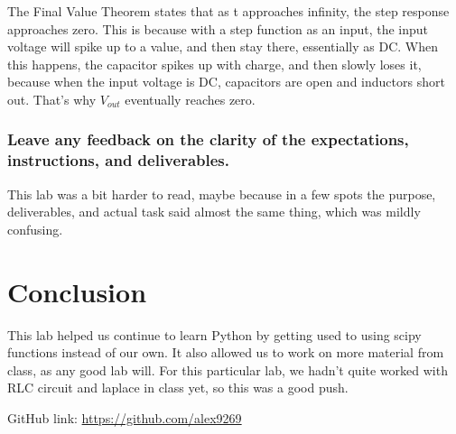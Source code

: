 \documentclass[12pt]{report}
\begin{document}
 The Final Value Theorem states that as t approaches infinity, the step response approaches zero. This is because with a step function as an input, the input voltage will spike up to a value, and then stay there, essentially as DC. When this happens, the capacitor spikes up with charge, and then slowly loses it, because when the input voltage is DC, capacitors are open and inductors short out. That's why $V_{out}$ eventually reaches zero.
 
 
 \subsubsection{Leave any feedback on the clarity of the expectations, instructions, and deliverables.}
 
 This lab was a bit harder to read, maybe because in a few spots the purpose, deliverables, and actual task said almost the same thing, which was mildly confusing. 
 
 \section{Conclusion}
 
 This lab helped us continue to learn Python by getting used to using scipy functions instead of our own. It also allowed us to work on more material from class, as any good lab will. For this particular lab, we hadn't quite worked with RLC circuit and laplace in class yet, so this was a good push. 
 
 GitHub link: \url{https://github.com/alex9269}
 
\end{document}
